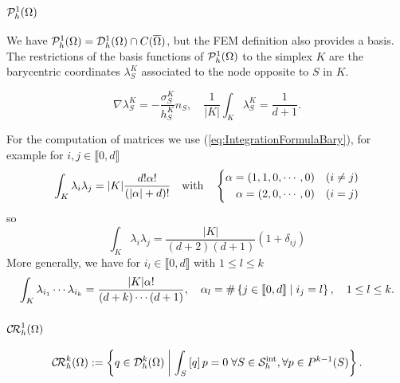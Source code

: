 \subsubsection{$\mathcal{P}^1_h(\Omega)$}
%
We have $\mathcal{P}^1_h(\Omega)= \mathcal{D}_h^1(\Omega)\cap C(\overline{\Omega})$, but the FEM definition also provides a basis.
The restrictions of the basis functions of $\mathcal{P}^1_h(\Omega)$ to the simplex $K$ are the barycentric coordinates $\lambda_S^K$ associated to the node opposite to $S$ in $K$.
%
\begin{yellowbox}
\begin{equation}\label{eq:}
\nabla \lambda_S^K = -\frac{\sigma_{S}^K}{h_S^K}n_S,\quad \frac{1}{|K|}\int_K \lambda_S^K = \frac{1}{d+1}.
\end{equation}
\end{yellowbox}%
%
For the computation of matrices we use (\ref{eq:IntegrationFormulaBary}), for example for $i,j\in  \llbracket 0, d \rrbracket$
%
\begin{align*}
\int_K \lambda_i \lambda_j  = |K|\frac{ d!\alpha!}{\left( \left|\alpha\right| + d\right)!} \quad\mbox{with}\quad
\left\{
\begin{aligned}
\alpha = (1,1,0,\cdots,0) \quad &(i\ne j)\\
\alpha = (2,0,\cdots,0) \quad &(i= j)\\
\end{aligned}
\right.
\end{align*}
%
so
%
\begin{equation}\label{eq:}
\int_K \lambda_i \lambda_j  = \frac{ |K|}{(d +2)(d+1)}(1+\delta_{ij})
\end{equation}
%
More generally, we have for $i_l\in  \llbracket 0, d \rrbracket$ with $1\le l\le k $
%
\begin{equation}\label{eq:}
\int_K \lambda_{i_1}\cdots \lambda_{i_k}  = \frac{ |K|\alpha!}{(d +k)\cdots(d+1)},\quad \alpha_l = \#\left\{j\in  \llbracket 0, d \rrbracket\;\middle|\;i_j = l\right\},\quad 1\le l\le k. 
\end{equation}
%


%
\subsubsection{$\mathcal{C\!R}^1_h(\Omega)$}
%
%
\begin{equation}\label{eq:}
\mathcal{C\!R}_h^k(\Omega) := \left\{q \in \mathcal{D}_h^k(\Omega)\;\middle|\;\int_S\left[q\right]p=0\;\forall S\in\mathcal S^{\rm int}_h,\forall p\in P^{k-1}(S)\right\}.
\end{equation}
%  



